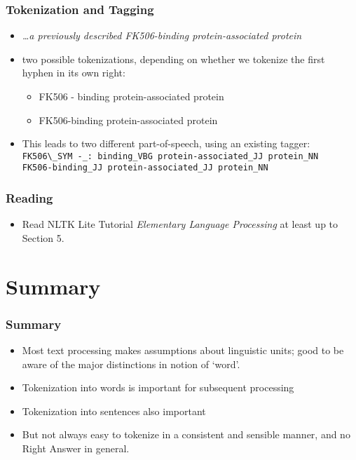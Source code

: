 \begin{frame}[fragile]
  \frametitle{Tokenization and Tagging}
  \begin{itemize}[<+->]
  \item \textit{\ldots a previously described FK506-binding
      protein-associated protein}\\
  \item two possible tokenizations, depending on whether we tokenize
    the first hyphen in its own right:
    \begin{itemize}
    \item FK506 - binding protein-associated protein
    \item FK506-binding protein-associated protein
    \end{itemize}
  \item This leads to two different part-of-speech, using an existing
    tagger:
{\small
  \verb!FK506\_SYM -_: binding_VBG protein-associated_JJ protein_NN!\\
  \verb!FK506-binding_JJ protein-associated_JJ protein_NN!
}
  \end{itemize}

\end{frame}
\begin{frame}[fragile]
  \frametitle{Reading}

  \begin{itemize}
  \item Read NLTK Lite Tutorial \textit{Elementary Language Processing} at least up to
    Section 5.
  \end{itemize}
\end{frame}




\section{Summary}

\begin{frame}
  \frametitle{Summary}

  \begin{itemize}[<+->]
  \item Most text processing makes assumptions about linguistic units;
    good to be aware of the major distinctions in notion of `word'.
  \item Tokenization into words is important for subsequent processing
  \item Tokenization into sentences also important
  \item But not always easy to tokenize in a consistent and sensible
    manner, and no Right Answer in general.
  \end{itemize}
\end{frame}




